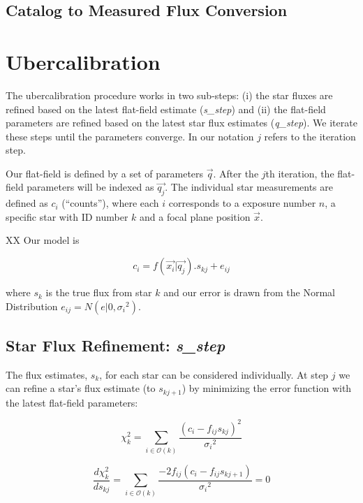 \documentclass[12pt,a4paper,twoside]{article}
\begin{document}
\subsection{Catalog to Measured Flux Conversion}

\section{Ubercalibration}
The ubercalibration procedure works in two sub-steps: (i) the star fluxes are refined based on the latest flat-field estimate (\textit{s\_step}) and (ii) the flat-field parameters are refined based on the latest star flux estimates (\textit{q\_step}). We iterate these steps until the parameters converge. In our notation $j$ refers to the iteration step. 

Our flat-field is defined by a set of parameters $\vec{q}$. After the $j$th iteration, the flat-field parameters will be indexed as $\vec{q_j}$. The individual star measurements are defined as $c_i$ (``counts''), where each $i$ corresponds to a exposure number $n$, a specific star with ID number $k$ and a focal plane position $\vec{x}$.

XX Our model is

\begin{equation}
c_i = f(\vec{x_i} | \vec{q_j}) . s_{kj} + e_{ij}
\end{equation}

where $s_k$ is the true flux from star $k$ and our error is drawn from the Normal Distribution $e_{ij} = N(e|0,{\sigma_i}^2)$.

\subsection{Star Flux Refinement: \textbf{\textit{s\_step}}}
The flux estimates, $s_k$, for each star can be considered individually. At step $j$ we can refine a star's flux estimate (to $s_{kj+1}$) by minimizing the error function with the latest flat-field parameters:

\begin{equation}
\chi^2_{k} = \sum_{i \in \mathcal{O}(k)} \frac{(c_i-f_{ij}s_{kj})^2}{{\sigma_i}^2}
\end{equation}

\begin{equation}
\frac{d\chi^2_{k}}{d s_{kj}} = \sum_{i \in \mathcal{O}(k)} \frac{-2 f_{ij} (c_i-f_{ij}s_{kj+1})}{{\sigma_i}^2} = 0
\end{equation}
\end{document}
